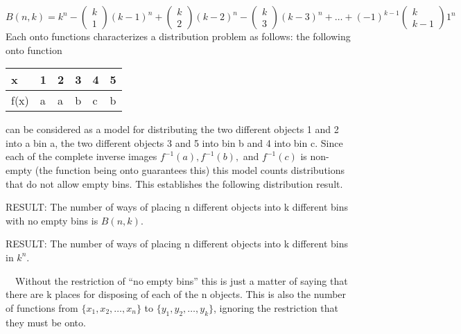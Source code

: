 \documentclass{article}
\begin{document}
\begin{equation*}
B\left(n,k\right)=k^n-\left(\begin{matrix}k\\1\end{matrix}\right)\left(k-1\right)^n+\left(\begin{matrix}k\\2\end{matrix}\right)\left(k-2\right)^n-\left(\begin{matrix}k\\3\end{matrix}\right)\left(k-3\right)^n+{\dots}+\left(-1\right)^{k-1}\left(\begin{matrix}k\\k-1\end{matrix}\right)1^n
\end{equation*}
Each onto functions characterizes a distribution problem as follows: the following onto function 

\begin{flushleft}
\tablefirsthead{}
\tablehead{}
\tabletail{}
\tablelasttail{}
\begin{supertabular}{m{0.47055987in}|m{0.35875985in}m{0.35875985in}m{0.35875985in}m{0.29625985in}m{0.29625985in}}
x &
1 &
2 &
3 &
4 &
5\\\hline
f(x) &
a &
a &
b &
c &
b\\
\end{supertabular}
\end{flushleft}
can be considered as a model for distributing the two different objects 1 and 2 into a bin a, the two different objects
3 and 5 into bin b and 4 into bin c. Since each of the complete inverse images 
$f^{-1}\left(a\right),f^{-1}\left(b\right),$ and  $f^{-1}(c)$ is non-empty (the function being onto guarantees this)
this model counts distributions that do not allow empty bins. This establishes the following distribution result. 

RESULT: The number of ways of placing n different objects into k different bins with no empty bins is  $B(n,k)$.

RESULT: The number of ways of placing n different objects into k different bins in  $k^n.$ 

\ \ Without the restriction of “no empty bins” this is just a matter of saying that there are k  places for disposing of
each of the n objects. This is also the number of functions from   $\{x_1,x_2,{\dots},x_n\}$ to 
$\{y_1,y_2,{\dots},y_k\}$, ignoring the restriction that they must be onto. 
\end{document}
